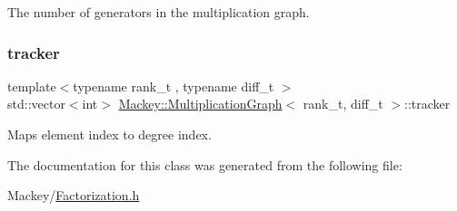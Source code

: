 The number of generators in the multiplication graph. 

\mbox{\label{classMackey_1_1MultiplicationGraph_ac831b81d1936c4dd2202dabaa8e4e2fb}} 
\subsubsection{\texorpdfstring{tracker}{tracker}}
{\footnotesize\ttfamily template$<$typename rank\+\_\+t , typename diff\+\_\+t $>$ \\
std\+::vector$<$int$>$ \hyperlink{classMackey_1_1MultiplicationGraph}{Mackey\+::\+Multiplication\+Graph}$<$ rank\+\_\+t, diff\+\_\+t $>$\+::tracker\hspace{0.3cm}{\ttfamily [protected]}}



Maps element index to degree index. 



The documentation for this class was generated from the following file\+:\begin{DoxyCompactItemize}
\item 
Mackey/\hyperlink{Factorization_8h}{Factorization.\+h}\end{DoxyCompactItemize}
